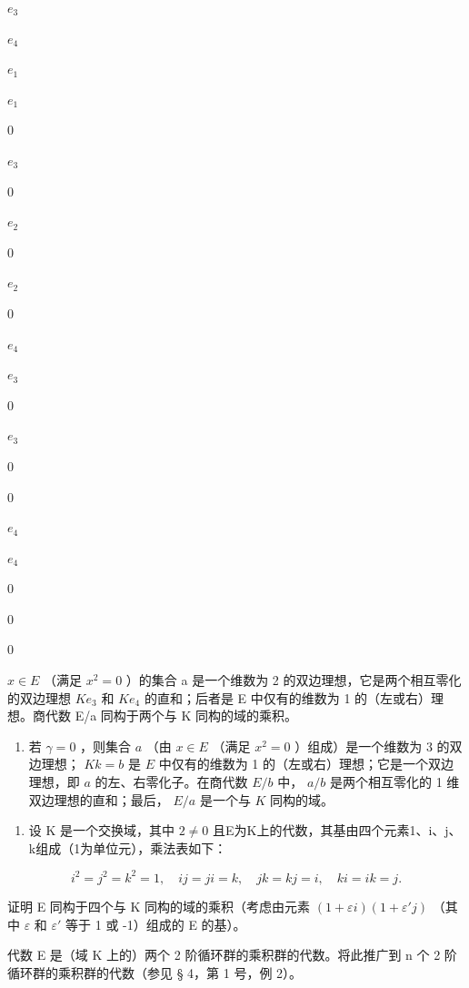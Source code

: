 \(e_3\)

\(e_4\)

\(e_1\)

\(e_1\)

0

\(e_3\)

0

\(e_2\)

0

\(e_2\)

0

\(e_4\)

\(e_3\)

0

\(e_3\)

0

0

\(e_4\)

\(e_4\)

0

0

0

 \(x \in E\) （满足 \(x^{2} = 0\) ）的集合 a 是一个维数为 2 的双边理想，它是两个相互零化的双边理想 \(Ke_{3}\) 和 \(Ke_{4}\) 的直和；后者是 E 中仅有的维数为 1 的（左或右）理想。商代数 E/a 同构于两个与 K 同构的域的乘积。

\begin{enumerate}
\def\labelenumi{(\alph{enumi})}
\setcounter{enumi}{2}
\tightlist
\item
  若 \(\gamma = 0\) ，则集合 \(a\) （由 \(x \in E\) （满足 \(x^2 = 0\) ）组成）是一个维数为 3 的双边理想； \(Kk = b\) 是 \(E\) 中仅有的维数为 1 的（左或右）理想；它是一个双边理想，即 \(a\) 的左、右零化子。在商代数 \(E/b\) 中， \(a/b\) 是两个相互零化的 1 维双边理想的直和；最后， \(E/a\) 是一个与 \(K\) 同构的域。
\end{enumerate}

\begin{enumerate}
\def\labelenumi{\arabic{enumi}.}
\setcounter{enumi}{6}
\tightlist
\item
  设 K 是一个交换域，其中 \(2 \neq 0\) 且E为K上的代数，其基由四个元素1、i、j、k组成（1为单位元），乘法表如下：
\end{enumerate}

\[
i ^ {2} = j ^ {2} = k ^ {2} = 1, \quad i j = j i = k, \quad j k = k j = i, \quad k i = i k = j.
\]

证明 E 同构于四个与 K 同构的域的乘积（考虑由元素 \((1 + \varepsilon i)(1 + \varepsilon'j)\) （其中 \(\varepsilon\) 和 \(\varepsilon'\) 等于 1 或 -1）组成的 E 的基）。

代数 E 是（域 K 上的）两个 2 阶循环群的乘积群的代数。将此推广到 n 个 2 阶循环群的乘积群的代数（参见 § 4，第 1 号，例 2）。

